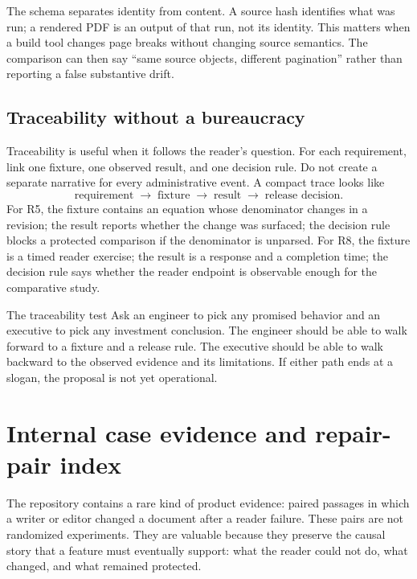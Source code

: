 The schema separates identity from content. A source hash identifies what was
run; a rendered PDF is an output of that run, not its identity. This matters
when a build tool changes page breaks without changing source semantics. The
comparison can then say ``same source objects, different pagination'' rather
than reporting a false substantive drift.

\subsection{Traceability without a bureaucracy}

Traceability is useful when it follows the reader's question. For each
requirement, link one fixture, one observed result, and one decision rule. Do
not create a separate narrative for every administrative event. A compact
trace looks like
\[
  \text{requirement}\;\longrightarrow\;\text{fixture}\;\longrightarrow\;
  \text{result}\;\longrightarrow\;\text{release decision}.
\]
For R5, the fixture contains an equation whose denominator changes in a
revision; the result reports whether the change was surfaced; the decision
rule blocks a protected comparison if the denominator is unparsed. For R8, the
fixture is a timed reader exercise; the result is a response and a completion
time; the decision rule says whether the reader endpoint is observable enough
for the comparative study.

\begin{checkpoint}{The traceability test}
Ask an engineer to pick any promised behavior and an executive to pick any
investment conclusion. The engineer should be able to walk forward to a
fixture and a release rule. The executive should be able to walk backward to
the observed evidence and its limitations. If either path ends at a slogan,
the proposal is not yet operational.
\end{checkpoint}

\section{Internal case evidence and repair-pair index}
\label{app:case-index}

The repository contains a rare kind of product evidence: paired passages in
which a writer or editor changed a document after a reader failure. These
pairs are not randomized experiments. They are valuable because they preserve
the causal story that a feature must eventually support: what the reader
could not do, what changed, and what remained protected.

